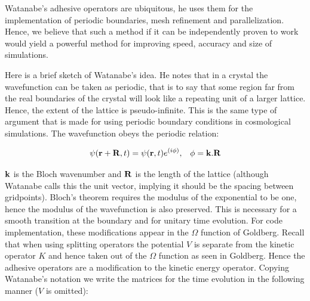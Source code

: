 Watanabe's adhesive operators are ubiquitous, he uses them for the implementation of periodic boundaries, mesh refinement and parallelization. Hence, we believe that such a method if it can be independently proven to work would yield a powerful method for improving speed, accuracy and size of simulations.

Here is a brief sketch of Watanabe's idea. He notes that in a crystal the wavefunction can be taken as periodic, that is to say that some region far from the real boundaries of the crystal will look like a repeating unit of a larger lattice. Hence, the extent of the lattice is pseudo-infinite. This is the same type of argument that is made for using periodic boundary conditions in cosmological simulations. The wavefunction obeys the periodic relation:

\begin{equation}
\psi({\bf r} + {\bf R},t )= \psi({\bf r},t)e^{(i\phi)}, \;\;\; \phi = {\bf k}.{\bf R}
\end{equation}

\noindent ${\bf k}$ is the Bloch wavenumber and ${\bf R}$ is the length of the lattice (although Watanabe calls this the unit vector, implying it should be the spacing between gridpoints). Bloch's theorem requires the modulus of the exponential to be one, hence the modulus of the wavefunction is also preserved. This is necessary for a smooth transition at the boundary and for unitary time evolution. For code implementation, these modifications appear in the $\Omega$ function of Goldberg. Recall that when using splitting operators the potential $V$ is separate from the kinetic operator $K$ and hence taken out of the $\Omega$ function as seen in Goldberg. Hence the adhesive operators are a modification to the kinetic energy operator. Copying Watanabe's notation we write the matrices for the time evolution in the following manner ($V$ is omitted):

